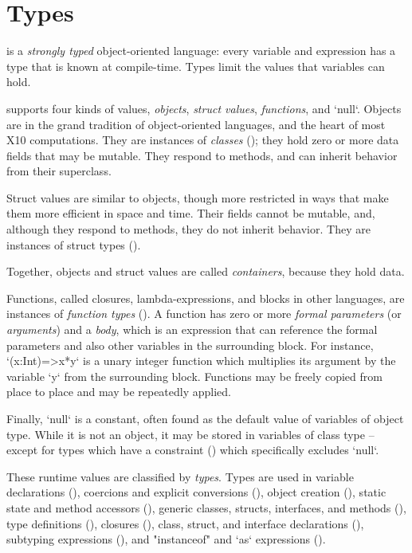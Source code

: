 \chapter{Types}
\label{XtenTypes}



{}\Xten{} is a {\em strongly typed} object-oriented language: every
variable and expression has a type that is known at compile-time.
Types limit the values that variables can hold.

{}\Xten{} supports four kinds of values, {\em objects}, {\em struct values},
{\em functions}, and \xcd`null`. Objects are in the grand tradition of
object-oriented languages, and the heart of most X10 computations. They are
instances of {\em classes} 
(); they hold zero or more data fields that may be
mutable. They respond to methods, and can inherit behavior from their
superclass.

Struct values are similar to objects, though more restricted in ways that make
them more efficient in space and time.  Their fields cannot be mutable, and,
although they respond to methods, they do not inherit behavior.  
They are instances of struct types ().

Together, objects and struct values are called {\em containers},
because they hold data.  

Functions, called closures, lambda-expressions, and blocks in other languages,
are 
instances of {\em function types} (). 
A function has zero or more {\em formal parameters} (or {\em arguments}) and a
{\em body}, which is 
an expression that can reference the formal parameters and also other
variables in the surrounding block. For instance, \xcd`(x:Int)=>x*y`
is a unary integer function which multiplies its argument by the
variable \xcd`y` from the surrounding block.  Functions may be freely
copied from place to place and may be repeatedly applied. 

Finally, \xcd`null` is a constant, often found as the default value of
variables of object type. While it is not an object, it may be stored in
variables of class type -- except for types which have a constraint
() which specifically excludes \xcd`null`.

These runtime values are classified by {\em types}. Types are used in
variable declarations (), 
coercions and  explicit conversions (),
object creation (),
static state and method accessors (),
generic classes, structs, interfaces, and methods (),
type definitions   (),
closures  (),
class, struct, and interface declarations  (),
subtyping expressions  (),
and
\xcd"instanceof" and \xcd`as` expressions ().


